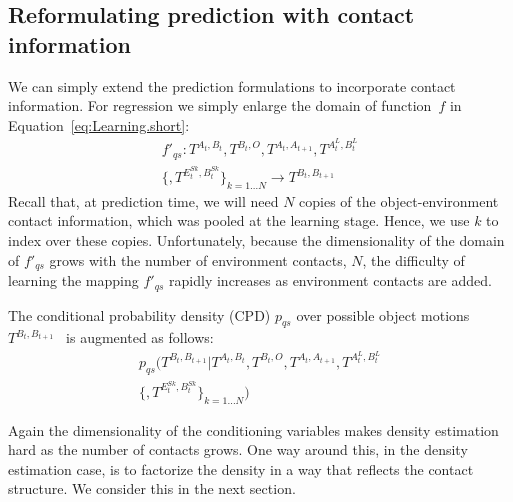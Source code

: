 \subsection{Reformulating prediction with contact information}
We can simply extend the prediction formulations to incorporate contact information. For regression we simply enlarge the domain of function~$f$
in Equation~\eqref{eq:Learning.short}:
\begin{multline}
f'_{qs}: T^{A_t, B_t}, T^{B_t, O}, T^{A_{t}, A_{t+1}}, T^{A^{L}_t, B^{L}_t} \\ \{, T^{E^{Sk}_t,B^{Sk}_t}\}_{k=1 \ldots N} \longrightarrow T^{B_{t}, B_{t+1}}
\label{eq:Learning.augmented}
\end{multline}
Recall that, at prediction time, we will need $N$ copies of the object-environment contact information, which was pooled at the learning stage. Hence, we use $k$ to index over these copies. Unfortunately, because the dimensionality of the domain of $f'_{qs}$ grows with the number of environment contacts, $N$, the difficulty of learning the mapping $f'_{qs}$ rapidly increases as environment contacts are added.

The conditional probability density (CPD) $p_{qs}$ over possible object motions $T^{B_{t}, B_{t+1}}$~\citep{kopicki_prediction_2009} is augmented as follows:
\begin{multline}
p_{qs}(T^{B_{t}, B_{t+1}} | T^{A_t, B_t}, T^{B_t, O}, T^{A_{t}, A_{t+1}}, T^{A^{L}_t, B^{L}_t} \\ \{, T^{E^{Sk}_t,B^{Sk}_t}\}_{k=1 \ldots N})
\label{eq:Learning.density}
\end{multline}

Again the dimensionality of the conditioning variables makes density estimation hard as the number of contacts grows. One way around this, in the density estimation case, is to factorize the density in a way that reflects the contact structure. We consider this in the next section.